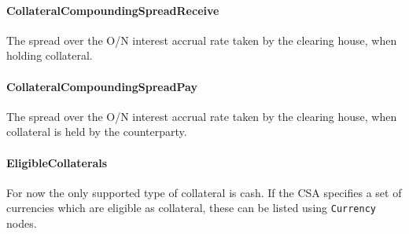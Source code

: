 \paragraph{CollateralCompoundingSpreadReceive} The spread over the O/N
interest accrual rate taken by the clearing house, when holding
collateral.

\paragraph{CollateralCompoundingSpreadPay} The spread over the O/N
interest accrual rate taken by the clearing house, when collateral is
held by the counterparty.

\paragraph{EligibleCollaterals} For now the only supported type of
collateral is cash. If the CSA specifies a set of currencies which
are eligible as collateral, these can be listed using
\lstinline!Currency! nodes.

